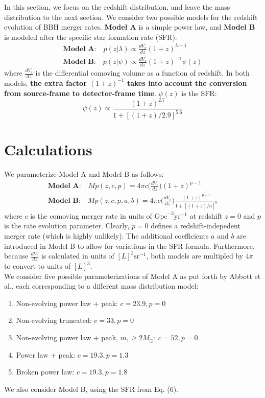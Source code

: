\documentclass{article}
\begin{document}
In this section, we focus on the redshift distribution, and leave the mass distribution to the next section. We consider two possible models for the redshift evolution of BBH merger rates. \textbf{Model A} is a simple power law, and \textbf{Model B} is modeled after the specific star formation rate (SFR):
\begin{gather}
    \textbf{Model A:} \quad p(z | \lambda) \propto \frac{dV_c}{dz} (1+z)^{\lambda-1} \\
    \textbf{Model B:} \quad p(z | \psi) \propto \frac{dV_c}{dz} (1+z)^{-1} \psi(z)
\end{gather}
where $\frac{dV_c}{dz}$ is the differential comoving volume as a function of redshift. In both models, \textbf{the extra factor $(1+z)^{-1}$ takes into account the conversion from source-frame to detector-frame time}. $\psi(z)$ is the SFR: 
\begin{equation}
    \psi(z) \propto \frac{(1+z)^{2.7}}{1 + [(1+z)/2.9]^{5.6}} 
\end{equation}



\section{Calculations}

We parameterize Model A and Model B as follows: 
\begin{gather}
    \textbf{Model A:} \quad Mp(z, c, p) = 4\pi c \Big(\frac{dV_c}{dz}\Big) (1+z)^{p-1} \\
    \textbf{Model B:} \quad Mp(z, c, p, a, b) = 4\pi c \Big(\frac{dV_c}{dz}\Big) \frac{(1+z)^{p-1}}{1 + [(1+z)/a]^b}
\end{gather}
where $c$ is the comoving merger rate in units of $\text{Gpc}^{-3} \text{yr}^{-1}$ at redshift $z=0$ and $p$ is the rate evolution parameter. Clearly, $p=0$ defines a redshift-indepedent merger rate (which is highly unlikely). The additional coefficients $a$ and $b$ are introduced in Model B to allow for variations in the SFR formula. Furthermore, because $\frac{dV_c}{dz}$ is calculated in units of $[L]^3 \text{sr}^{-1}$, both models are multipled by $4\pi$ to convert to units of $[L]^3$. \\

We consider five possible parameterizations of Model A as put forth by Abbott et al., each corresponding to a different mass distribution model: 
\begin{enumerate}
    \setlength{\itemsep}{0pt}
    \item Non-evolving power law + peak: $c = 23.9, p = 0$
    \item Non-evolving truncated: $c = 33, p = 0$
    \item Non-evolving power law + peak, $m_1 \geq 2 M_\odot$: $c = 52, p = 0$
    \item Power law + peak: $c = 19.3, p = 1.3$
    \item Broken power law: $c = 19.3, p = 1.8$
\end{enumerate}
We also consider Model B, using the SFR from Eq. (6). \\
\end{document}

